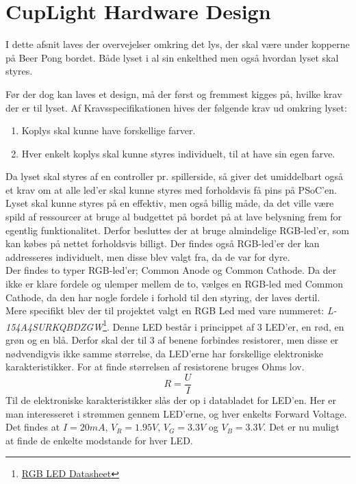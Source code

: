 \documentclass[HardwareDesign/HardwareDesign_main.tex]{subfiles}
\begin{document}
\section{CupLight Hardware Design}
 I dette afsnit laves der overvejelser omkring det lys, der skal være under kopperne på Beer Pong bordet. Både lyset i al sin enkelthed men også hvordan lyset skal styres.
 
 
Før der dog kan laves et design, må der først og fremmest kigges på, hvilke krav der er til lyset. Af Kravsspecifikationen hives der følgende krav ud omkring lyset:
\begin{enumerate}
    \item Koplys skal kunne have forskellige farver.
    \item Hver enkelt koplys skal kunne styres individuelt, til at have sin egen farve.
\end{enumerate}
Da lyset skal styres af en controller pr. spillerside, så giver det umiddelbart også et krav om at alle led'er skal kunne styres med forholdsvis få pins på PSoC'en. 
\\Lyset skal kunne styres på en effektiv, men også billig måde, da det ville være spild af ressourcer at bruge al budgettet på bordet på at lave belysning frem for egentlig funktionalitet. Derfor besluttes der at bruge almindelige RGB-led'er, som kan købes på nettet forholdsvis billigt. Der findes også RGB-led'er der kan addresseres individuelt, men disse blev valgt fra, da de var for dyre. 
\\Der findes to typer RGB-led'er; Common Anode og Common Cathode. Da der ikke er klare fordele og ulemper mellem de to, vælges en RGB-led med Common Cathode, da den har nogle fordele i forhold til den styring, der laves dertil. 
\\Mere specifikt blev der til projektet valgt en RGB Led med vare nummeret: \textit{L-154A4SURKQBDZGW}\footnote{\href{http://www.farnell.com/datasheets/2046599.pdf?_ga=2.134869041.1755092500.1541003763-1168485423.1534934558}{RGB LED Datasheet}}. Denne LED består i princippet af 3 LED'er, en rød, en grøn og en blå. Derfor skal der til 3 af benene forbindes resistorer, men disse er nødvendigvis ikke samme størrelse, da LED'erne har forskellige elektroniske karakteristikker. For at finde størrelsen af resistorene bruges Ohms lov.
\begin{equation}
    R=\frac{U}{I}
\end{equation}
Til de elektroniske karakteristikker slås der op i databladet for LED'en. Her er man interesseret i strømmen gennem LED'erne, og hver enkelts Forward Voltage. Det findes at $I=20mA$, $V_R=1.95V$, $V_G=3.3V$ og $V_B=3.3V$. Det er nu muligt at finde de enkelte modstande for hver LED.
\end{document}
